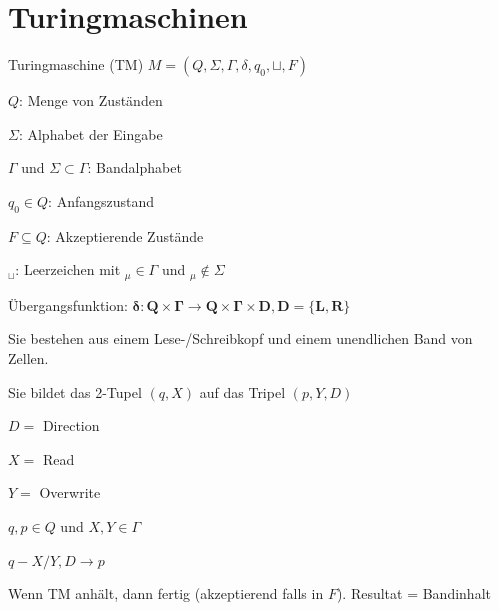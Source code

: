 \graphicspath{{images/}}

\section*{Turingmaschinen}

\begin{theorem}{Turingmaschine (TM)} $M=\left(Q, \Sigma, \Gamma, \delta, q_{0}, \sqcup , F\right)$

    \begin{minipage}{0.45\linewidth}
        $Q$: Menge von Zuständen

        $\Sigma$: Alphabet der Eingabe

        $\Gamma$ und $\Sigma \subset \Gamma$: Bandalphabet
    \end{minipage}
    \begin{minipage}{0.55\linewidth}
        $q_{0} \in Q$: Anfangszustand

        $F \subseteq Q$: Akzeptierende Zustände

        ${ }_{\sqcup }$: Leerzeichen mit ${ }_{\mu} \in \Gamma$ und ${ }_{\mu} \notin \Sigma$
    \end{minipage}

    Übergangsfunktion: $\boldsymbol{\delta}: \boldsymbol{Q} \times \boldsymbol{\Gamma} \rightarrow \boldsymbol{Q} \times \boldsymbol{\Gamma} \times \boldsymbol{D}, \boldsymbol{D}=\{\boldsymbol{L}, \boldsymbol{R}\}$
    
    \vspace{1mm}

    Sie bestehen aus einem Lese-/Schreibkopf und einem unendlichen Band von Zellen.

    \vspace{1mm}

    Sie bildet das 2-Tupel $(q, X)$ auf das Tripel $(p, Y, D)$

    \begin{minipage}{0.45\linewidth}
        $D=$ Direction

        $X=$ Read

        $Y=$ Overwrite
    \end{minipage}
    \begin{minipage}{0.5\linewidth}
       $q, p \in Q$ und $X, Y \in \Gamma$

       \vspace{1mm}

       \emph{$q-X / Y, D \rightarrow p$}
    \end{minipage}

    \vspace{1mm}
    {\small Wenn TM anhält, dann fertig (akzeptierend falls in $F$). Resultat = Bandinhalt}
\end{theorem}

